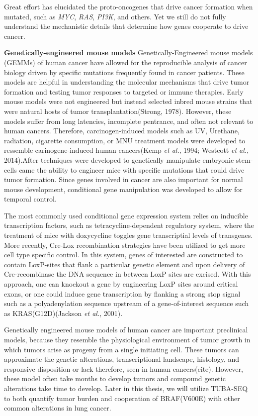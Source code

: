 Great effort has elucidated the proto-oncogenes that drive cancer formation when mutated, such as \emph{MYC}, \emph{RAS}, \emph{PI3K}, and others. Yet we still do not fully understand the mechanistic details that determine how genes cooperate to drive cancer.

\textbf{Genetically-engineered mouse models} Genetically-Engineered mouse models (GEMMs) of human cancer have allowed for the reproducible analysis of cancer biology driven by specific mutations frequently found in cancer patients. These models are helpful in understanding the molecular mechanisms that drive tumor formation and testing tumor responses to targeted or immune therapies. Early mouse models were not engineered but instead selected inbred mouse strains that were natural hosts of tumor transplantation(Strong, 1978). However, these models suffer from long latencies, incomplete pentrance, and often not relevant to human cancers. Therefore, carcinogen-induced models such as UV, Urethane, radiation, cigarette consumption, or MNU treatment models were developed to ressemble carinogene-induced human cancers(Kemp \emph{et al.}, 1994; Westcott \emph{et al.}, 2014).After techniques were developed to genetically manipulate embryonic stem-cells came the ability to engineer mice with specific mutations that could drive tumor formation. Since genes involved in cancer are also important for normal mouse development, conditional gene manipulation was developed to allow for temporal control.

The most commonly used conditional gene expression system relies on inducible transcription factors, such as tetracycline-dependent regulatory system, where the treatment of mice with doxycycline toggles gene transcriptial levels of transgenes. More recently, Cre-Lox recombination strategies have been utilized to get more cell type specific control. In this system, genes of interested are constructed to contain LoxP-sites that flank a particular genetic element and upon delivery of Cre-recombinase the DNA sequence in between LoxP sites are excised. With this approach, one can knockout a gene by engineering LoxP sites around critical exons, or one could induce gene transcription by flanking a strong stop signal such as a polyadenylation sequence upstream of a gene-of-interest sequence such as KRAS(G12D)(Jackson \emph{et al.}, 2001).

Genetically engineered mouse models of human cancer are important preclinical models, because they resemble the physiological environment of tumor growth in which tumors arise as progeny from a single initiating cell. These tumors can approximate the genetic alterations, transcriptional landscape, histology, and responsive disposition or lack therefore, seen in human cancers(cite). However, these model often take months to develop tumors and compound genetic alterations take time to develop. Later in this thesis, we will utilize TUBA-SEQ to both quantify tumor burden and cooperation of BRAF(V600E) with other common alterations in lung cancer.

